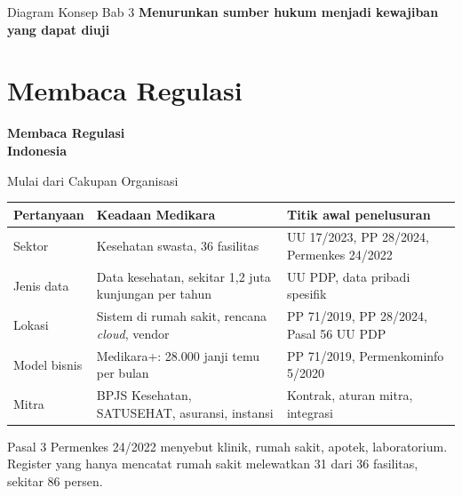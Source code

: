 \documentclass[aspectratio=169, table, 12pt]{beamer}
\begin{document}
\begin{frame}{{\Large Diagram Konsep Bab 3}}
  \centering
  {\small\bfseries Menurunkan sumber hukum menjadi kewajiban yang dapat diuji}\par\medskip
  \label{fig:session03-ilustrasi-bab}
\end{frame}

\section{Membaca Regulasi}

\begin{frame}{\hfill}
  \centering
  \Huge{\textbf{Membaca Regulasi\\Indonesia}}
\end{frame}

\begin{frame}{{\Large Mulai dari Cakupan Organisasi}}
  \vspace{2pt}
  \footnotesize
  \begin{tabularx}{\textwidth}{|>{\raggedright\arraybackslash}p{}|>{\raggedright\arraybackslash}X|>{\raggedright\arraybackslash}X|}
    \hline
    \textbf{Pertanyaan} & \textbf{Keadaan Medikara} & \textbf{Titik awal penelusuran} \\ \hline
    Sektor & Kesehatan swasta, 36 fasilitas & UU 17/2023, PP 28/2024, Permenkes 24/2022 \\ \hline
    Jenis data & Data kesehatan, sekitar 1,2 juta kunjungan per tahun & UU PDP, data pribadi spesifik \\ \hline
    Lokasi & Sistem di rumah sakit, rencana \textit{cloud}, vendor & PP 71/2019, PP 28/2024, Pasal 56 UU PDP \\ \hline
    Model bisnis & Medikara+: 28.000 janji temu per bulan & PP 71/2019, Permenkominfo 5/2020 \\ \hline
    Mitra & BPJS Kesehatan, SATUSEHAT, asuransi, instansi & Kontrak, aturan mitra, integrasi \\ \hline
  \end{tabularx}

  \vspace{6pt}
  \small Pasal 3 Permenkes 24/2022 menyebut klinik, rumah sakit, apotek, laboratorium. Register yang
  hanya mencatat rumah sakit melewatkan 31 dari 36 fasilitas, sekitar 86 persen.
\end{frame}
\end{document}
